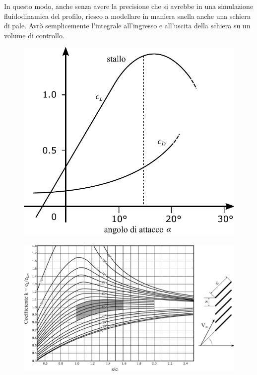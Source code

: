 In questo modo, anche senza avere la precisione che si avrebbe in una simulazione fluidodinamica del profilo, riesco a modellare in maniera snella anche una schiera di pale. Avrò semplicemente l'integrale all'ingresso e all'uscita della schiera su un volume di controllo. 
\begin{figure}
\centering
\begin{minipage}{.3\textwidth}
  \centering
  \includegraphics[width=.95\linewidth]{fig/cdcl.pdf}
  \label{fig:cdcl}
\end{minipage}%
\begin{minipage}{.7\textwidth}
  \centering
  \includegraphics[width=.95\linewidth]{fig/EffSchiera.pdf}
  \label{fig:EffSchiera}
\end{minipage}
\end{figure}

